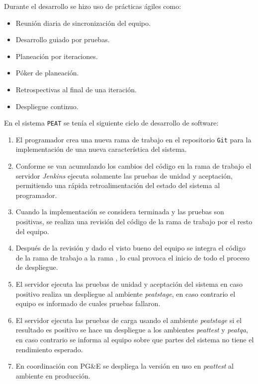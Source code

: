 Durante el desarrollo se hizo uso de prácticas ágiles como:

\begin{itemize}
  \item Reunión diaria de sincronización del equipo.
  \item Desarrollo guiado por pruebas.
  \item Planeación por iteraciones.
  \item Póker de planeación.
  \item Retrospectivas al final de una iteración.
  \item Despliegue continuo.
\end{itemize}

En el sistema \texttt{PEAT} se tenía el siguiente ciclo de desarrollo de
software:

\begin{enumerate}
\item El programador crea una nueva rama de trabajo en el repositorio \texttt{Git}
  para la implementación de una nueva característica del sistema.
\item Conforme se van acumulando los cambios del código en la rama de trabajo
  el servidor \textit{Jenkins} ejecuta solamente las pruebas de unidad y aceptación,
  permitiendo una rápida retroalimentación del estado del sistema al programador.
\item Cuando la implementación se considera terminada y las pruebas son positivas,
  se realiza una revisión del código de la rama de trabajo por el resto del
  equipo.
\item Después de la revisión y dado el visto bueno del equipo se integra el
  código de la rama de trabajo a la rama , lo cual provoca el
  inicio de todo el proceso de despliegue.
\item El servidor ejecuta las pruebas de unidad y aceptación del sistema en
  caso positivo realiza un despliegue al ambiente \textit{peatstage}, en caso
  contrario el equipo es informado de cuales pruebas fallaron.
\item El servidor ejecuta las pruebas de carga usando el ambiente \textit{peatstage}
  si el resultado es positivo se hace un despliegue a los ambientes \textit{peattest}
  y \textit{peatqa}, en caso contrario se informa al equipo sobre que partes del
  sistema no tiene el rendimiento esperado.
\item En coordinación con PG\&E se despliega la versión en uso en \textit{peattest}
  al ambiente en producción.
\end{enumerate}

